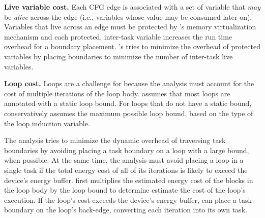 {\noindent \bf Live variable cost.} Each CFG edge is associated with a set of variable that {\em may} be {\em alive} across the edge (i.e., variables whose value may be consumed later on). Variables that live across an edge must be protected by \sys's memory virtualization mechanism and each protected, inter-task variable increases the run time overhead for a boundary placement. \sys's tries to minimize the overhead of protected variables by placing boundaries to minimize the number of inter-task live variables.

{\noindent \bf Loop cost.} Loops are a challenge for \sys because the analysis must account for the cost of multiple iterations of the loop body. \sys assumes that most loops are
annotated with a static loop bound. For loops that do not have a static bound, \sys conservatively assumes the maximum possible loop bound, based on the type of the loop induction variable.


The analysis tries to minimize the dynamic overhead of traversing task boundaries by avoiding placing a task boundary on a loop with a large bound, when possible. At the same time, the analysis must avoid placing a loop in a single task if the total energy cost of all of its iterations is likely to exceed the device's energy buffer. \sys first multiplies the estimated energy cost of the blocks in the loop body by the loop bound to determine estimate the cost of the loop's execution. If the loop's cost exceeds the device's energy buffer, \sys can place a task boundary on the loop's back-edge, converting each iteration into its own task.  



